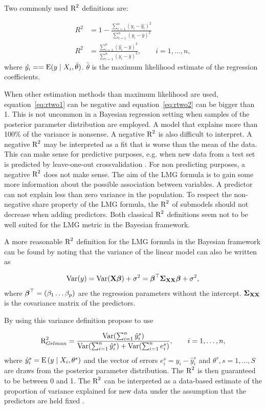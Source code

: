 \documentclass[11pt,a4paper,twoside]{book}
\begin{document}
Two commonly used $\text{R}^2$ definitions are:
   
      \begin{align} 
     R^2 &= 1 - \frac{\sum_{i=1}^{n}(y_{i} - \hat{y_{i}})^2}{\sum_{i=1}^{n}(y_{i}-\bar{y})^2}   \label{eq:rtwo1} \\
     R^2 &= \frac{\sum_{i=1}^{n}(\hat{y_{i}} - \bar{y})^2}{\sum_{i=1}^{n}(y_{i}-\bar{y})^2}, \qquad i = 1,\dots,n,   \label{eq:rtwo2} 
   \end{align} 
where $\hat{y_{i}} = = \operatorname{E} ({y \mid X_{i}, \hat{\theta}})$.  $\hat{\theta}$ is the maximum likelihood estimate of the regression coefficients.

When other estimation methods than maximum likelihood are used, equation~\eqref{eq:rtwo1} can be negative and equation~\eqref{eq:rtwo2}  can be bigger than 1. This is not uncommon in a Bayesian regression setting when samples of the posterior parameter distribution are employed. A model that explains more than 100\% of the variance is nonsense. A negative $\text{R}^2$ is also difficult to interpret. A negative $\text{R}^2$ may be interpreted as a fit that is worse than the mean of the data. This can make sense for predictive purposes, e.g. when new data from a test set is predicted by leave-one-out crossvalidation \citep{Alexander2015}.  For non predicting purposes, a negative $\text{R}^2$ does not make sense. The aim of the LMG formula is to gain some more information about the possible association between variables. A predictor can not explain less than zero variance in the population. To respect the non-negative share property of the LMG formula, the $\text{R}^2$ of submodels should not decrease when adding predictors. Both classical $\text{R}^2$ definitions seem not to be well suited for the LMG metric in the Bayesian framework.

A more reasonable $\text{R}^2$ definition for the LMG formula in the Bayesian framework can be found by noting that the variance of the linear model can also be written as 

      \begin{align} 
        \operatorname{Var}(y) = \operatorname{Var}({\mathbf{X}} {\boldsymbol{\beta}}) + \sigma^2 = {\boldsymbol{\beta}}^\top {\boldsymbol{\Sigma}}{}_{{\mathbf{X}} {\mathbf{X}}}  {\boldsymbol{\beta}} + \sigma^2, \label{eq:vary} 
   \end{align}
where ${\boldsymbol{\beta}}^\top = (\beta_{1} \dots \beta_{p})$ are the regression parameters without the intercept.
${\boldsymbol{\Sigma}}{}_{{\mathbf{X}} {\mathbf{X}}}$ is the covariance matrix of the predictors.

By using this variance definition \cite{Gelman2017} propose to use 

      \begin{align} 
       \text{R}^2_{Gelman} = \frac{\operatorname{Var}(\sum_{i=1}^{n}\hat{y}^s_{i})}{\operatorname{Var}(\sum_{i=1}^{n}\hat{y}^s_{i})+\operatorname{Var}(\sum_{i=1}^{n}e^s_{i})}, \qquad i = 1,\dots,n, \label{eq:rtwoGelman} 
   \end{align} 
where $\hat{y}^s_{i}  = \operatorname{E} \left({y \mid X_{i}, \theta^s}\right) $ and the vector of errors $e^s_{i} = y_{i} - \hat{y}^s_{i}$ and $\theta^s, s = 1,\dotsc, S$ are draws from the posterior parameter distribution. The $\text{R}^2$ is then guaranteed to be between 0 and 1. The $\text{R}^2$ can  be interpreted as a data-based estimate of the proportion of variance explained for new data under the assumption that the predictors are held fixed \citep{Gelman2017}.
\end{document}
